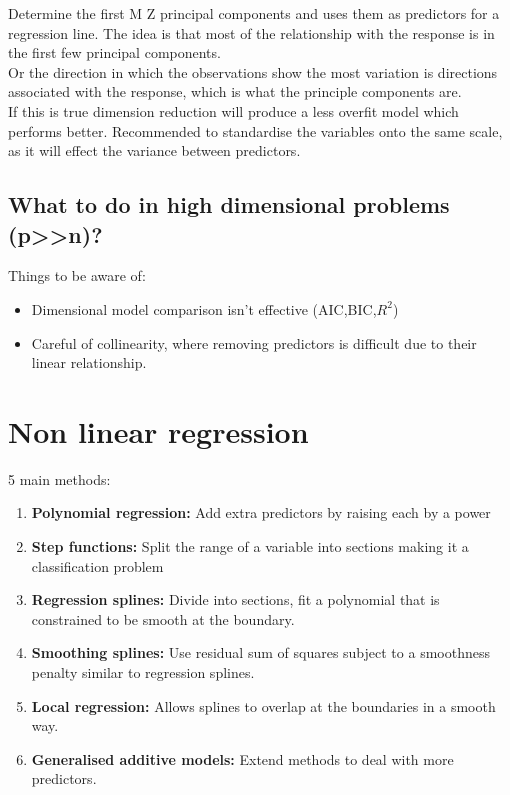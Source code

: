 \documentclass[11pt]{scrartcl} %
\begin{document}
Determine the first M Z principal components and uses them as predictors for a regression line.
The idea is that most of the relationship with the response is in the first few principal components.\\

Or the direction in which the observations show the most variation is directions associated with the response,
which is what the principle components are.\\

If this is true dimension reduction will produce a less overfit model which performs better. Recommended
to standardise the variables onto the same scale, as it will effect the variance between predictors.

\subsection{What to do in high dimensional problems (p>>n)?}

Things to be aware of:

\begin{itemize}
	\item Dimensional model comparison isn't effective (AIC,BIC,\(R^2\))
	\item Careful of collinearity, where removing predictors is difficult due to their linear relationship.
\end{itemize}

\section{Non linear regression}

5 main methods:

\begin{enumerate}
	\item \textbf{Polynomial regression:} Add extra predictors by raising each by a power
	\item \textbf{Step functions:} Split the range of a variable into sections making it a classification problem
	\item \textbf{Regression splines:} Divide into sections, fit a polynomial that is constrained to be smooth
	at the boundary.
	\item \textbf{Smoothing splines:} Use residual sum of squares subject to a smoothness penalty similar to regression splines.
	\item \textbf{Local regression:} Allows splines to overlap at the boundaries in a smooth way.
	\item \textbf{Generalised additive models:} Extend methods to deal with more predictors.
\end{enumerate}
\end{document}
